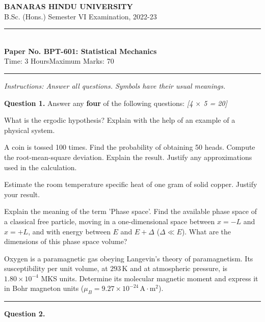 \documentclass[11pt,a4paper]{article}
\newcommand{\pts}[1]{\hfill   \textit{[#1]}}
\begin{document}
\begin{center}
  {\large\bfseries BANARAS HINDU UNIVERSITY}\\[2pt]
  {\normalsize B.Sc. (Hons.) Semester VI Examination, 2022-23}\\[6pt]
  \rule{0.8\linewidth}{0.5pt}\\[6pt]
  {\large\bfseries Paper No. BPT-601: Statistical Mechanics}\\[4pt]
  {\normalsize Time: 3 Hours\hfill Maximum Marks: 70}
\end{center}
\rule{\linewidth}{0.4pt}
\smallskip



\noindent   \textit{Instructions: Answer all questions. Symbols have their usual meanings.}
\bigskip




\noindent   \textbf{Question 1.} Answer any   \textbf{four} of the following questions: \pts{4 $ \times$ 5 = 20}

\begin{parts}
  \item What is the ergodic hypothesis? Explain with the help of an example of a physical system.
  \item A coin is tossed 100 times. Find the probability of obtaining 50 heads. Compute the root-mean-square deviation. Explain the result. Justify any approximations used in the calculation.
  \item Estimate the room temperature specific heat of one gram of solid copper. Justify your result.
  \item Explain the meaning of the term 'Phase space'. Find the available phase space of a classical free particle, moving in a one-dimensional space between $x = -L$ and $x = +L$, and with energy between $E$ and $E + \Delta$ ($\Delta \ll E$). What are the dimensions of this phase space volume?
  \item Oxygen is a paramagnetic gas obeying Langevin's theory of paramagnetism. Its susceptibility per unit volume, at $293\, \text{K}$ and at atmospheric pressure, is $1.80  \times 10^{-4}$ MKS units. Determine its molecular magnetic moment and express it in Bohr magneton units ($\mu_B = 9.27  \times 10^{-24}\, \text{A}\cdot \text{m}^2$).
\end{parts}

\medskip\rule{\linewidth}{0.2pt}




\noindent   \textbf{Question 2.}
\end{document}
